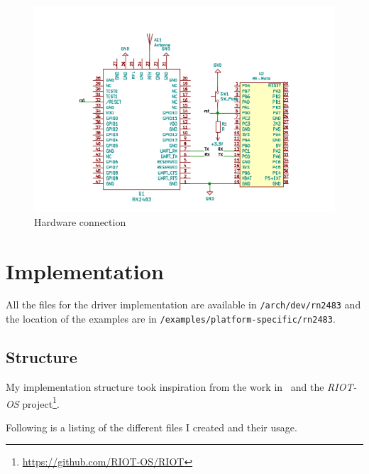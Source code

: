 \begin{figure}[H]
  \centering
  \includegraphics[scale=0.70]{thesis.tex/chapters/driver/fig/conn_diag.pdf}
  \caption{Hardware connection\label{fig:schemaconn}}
\end{figure}

\section{Implementation}

All the files for the driver implementation are available in
\lstinline{/arch/dev/rn2483} and the location of the examples are in
\lstinline{/examples/platform-specific/rn2483}.

\subsection{Structure}

My implementation structure took inspiration from the work 
in~\cite{8847137} and the \emph{RIOT-OS}
project\footnote{\url{https://github.com/RIOT-OS/RIOT}}. 

Following is a listing of the different files I created and their
usage. %

